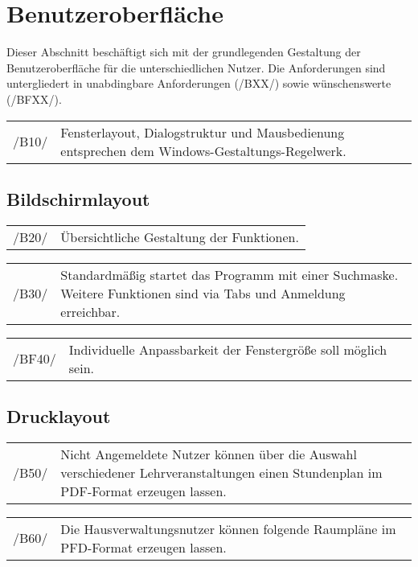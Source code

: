 \section{Benutzeroberfläche}
\label{sec:Benutzeroberfläche}


Dieser Abschnitt beschäftigt sich mit der grundlegenden Gestaltung der Benutzeroberfläche für die unterschiedlichen Nutzer. Die Anforderungen sind untergliedert in unabdingbare Anforderungen (/BXX/) sowie wünschenswerte (/BFXX/).

\begin{tabular}{p{1.5cm}p{14.5cm}}
 /B10/	& Fensterlayout, Dialogstruktur und Mausbedienung entsprechen dem Windows-Gestaltungs-Regelwerk. \\[0.25cm]	 
\end{tabular}

\subsection{Bildschirmlayout}

\begin{tabular}{p{1.5cm}p{14.5cm}}
 /B20/	& Übersichtliche Gestaltung der Funktionen. \\[0.25cm]	 
\end{tabular}

\begin{tabular}{p{1.5cm}p{14.5cm}}
 /B30/	& Standardmäßig startet das Programm mit einer Suchmaske. Weitere Funktionen sind via Tabs und Anmeldung erreichbar. \\[0.25cm]	 
\end{tabular}

\begin{tabular}{p{1.5cm}p{14.5cm}}
 /BF40/	& Individuelle Anpassbarkeit der Fenstergröße soll möglich sein. \\[0.25cm]	 
\end{tabular}

\subsection{Drucklayout}

\begin{tabular}{p{1.5cm}p{14.5cm}}
 /B50/	& Nicht Angemeldete Nutzer können über die Auswahl verschiedener Lehrveranstaltungen einen Stundenplan im PDF-Format erzeugen lassen. \\[0.25cm]	 
\end{tabular}

\begin{tabular}{p{1.5cm}p{14.5cm}}
 /B60/	& Die Hausverwaltungsnutzer können folgende Raumpläne im PFD-Format erzeugen lassen. \\[0.25cm]	 
\end{tabular}

